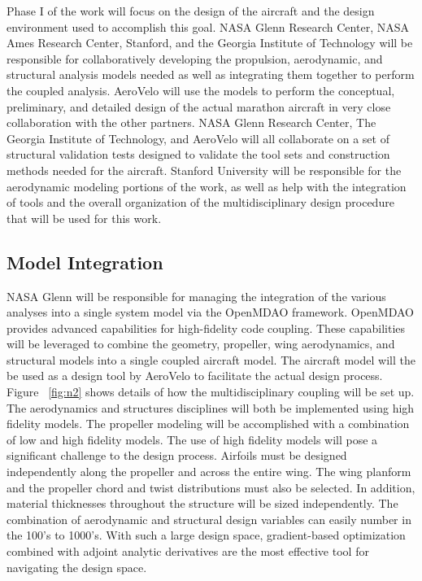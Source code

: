 \documentclass[]{aiaa-tc}
\begin{document}
    Phase I of the work will focus on the design of the aircraft and the design environment used 
    to accomplish this goal. NASA Glenn Research Center, 
    NASA Ames Research Center, Stanford, and the Georgia Institute of Technology will be responsible 
    for collaboratively developing the propulsion, aerodynamic, and structural analysis 
    models needed as well as integrating them together to perform the coupled analysis. AeroVelo will
    use the models to perform the conceptual, preliminary, and detailed design of the actual marathon 
    aircraft in very close collaboration with the other partners. NASA Glenn Research Center, 
    The Georgia Institute of Technology, and AeroVelo will all collaborate on a set of structural validation 
    tests designed to validate the tool sets and construction methods needed for the aircraft.  Stanford 
    University will be responsible for the aerodynamic modeling portions of the work, as well as 
    help with the integration of tools and the overall organization of the multidisciplinary design 
    procedure that will be used for this work.

    \subsection{Model Integration}

    NASA Glenn will be responsible for managing the integration of the various analyses into 
    a single system model via the OpenMDAO framework. OpenMDAO provides advanced 
    capabilities for high-fidelity code coupling. These capabilities will be leveraged to combine the geometry,
    propeller, wing aerodynamics, and structural models into a single coupled aircraft model. The aircraft 
    model will the be used as a design tool by AeroVelo to facilitate the actual design process. 
    Figure ~\ref{fig:n2} shows details of how the multidisciplinary coupling will be set up. The aerodynamics 
    and structures disciplines will both be implemented using high fidelity models. The propeller modeling 
    will be accomplished with a combination of low and high fidelity models. The use of high fidelity models 
    will pose a significant challenge to the design process. Airfoils must be designed independently along the propeller and
    across the entire wing. The wing planform and the propeller chord and twist distributions must also be selected.  In addition, material thicknesses throughout the structure
    will be sized independently. The combination of aerodynamic and structural design variables 
    can easily number in the 100's to 1000's. With such a large design space, gradient-based optimization 
    combined with adjoint analytic derivatives are the most effective tool for navigating the design space. 
\end{document}
